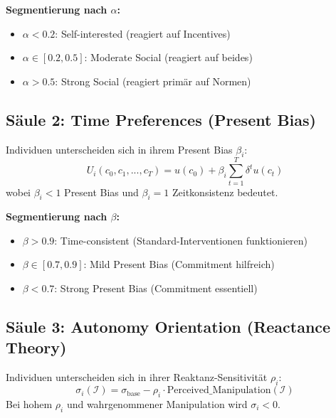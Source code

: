 \textbf{Segmentierung nach $\alpha$:}
\begin{itemize}
\item $\alpha < 0.2$: Self-interested (reagiert auf Incentives)
\item $\alpha \in [0.2, 0.5]$: Moderate Social (reagiert auf beides)
\item $\alpha > 0.5$: Strong Social (reagiert primär auf Normen)
\end{itemize}

\subsection{Säule 2: Time Preferences (Present Bias)}

\begin{tcolorbox}[colback=blue!5!white, colframe=blue!75!black,
    title=Axiom PAP1-2: Temporal Preference Heterogeneity]
Individuen unterscheiden sich in ihrem Present Bias $\beta_i$:
\begin{equation}
U_i(c_0, c_1, ..., c_T) = u(c_0) + \beta_i \sum_{t=1}^{T} \delta^t u(c_t)
\label{eq:19-quasi-hyperbolic}
\end{equation}
wobei $\beta_i < 1$ Present Bias und $\beta_i = 1$ Zeitkonsistenz bedeutet.
\end{tcolorbox}

\textbf{Segmentierung nach $\beta$:}
\begin{itemize}
\item $\beta > 0.9$: Time-consistent (Standard-Interventionen funktionieren)
\item $\beta \in [0.7, 0.9]$: Mild Present Bias (Commitment hilfreich)
\item $\beta < 0.7$: Strong Present Bias (Commitment essentiell)
\end{itemize}

\subsection{Säule 3: Autonomy Orientation (Reactance Theory)}

\begin{tcolorbox}[colback=blue!5!white, colframe=blue!75!black,
    title=Axiom PAP1-3: Autonomy-Reactance Heterogeneity]
Individuen unterscheiden sich in ihrer Reaktanz-Sensitivität $\rho_i$:
\begin{equation}
\sigma_i(\mathcal{I}) = \sigma_{\text{base}} - \rho_i \cdot \text{Perceived\_Manipulation}(\mathcal{I})
\label{eq:19-reactance}
\end{equation}
Bei hohem $\rho_i$ und wahrgenommener Manipulation wird $\sigma_i < 0$.
\end{tcolorbox}

